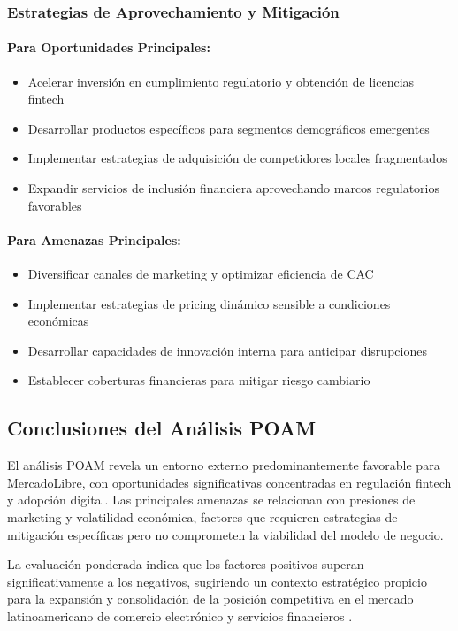 \subsubsection{Estrategias de Aprovechamiento y Mitigación}

\paragraph{Para Oportunidades Principales:}
\begin{itemize}
\item Acelerar inversión en cumplimiento regulatorio y obtención de licencias fintech
\item Desarrollar productos específicos para segmentos demográficos emergentes
\item Implementar estrategias de adquisición de competidores locales fragmentados
\item Expandir servicios de inclusión financiera aprovechando marcos regulatorios favorables
\end{itemize}

\paragraph{Para Amenazas Principales:}
\begin{itemize}
\item Diversificar canales de marketing y optimizar eficiencia de CAC
\item Implementar estrategias de pricing dinámico sensible a condiciones económicas
\item Desarrollar capacidades de innovación interna para anticipar disrupciones
\item Establecer coberturas financieras para mitigar riesgo cambiario
\end{itemize}

\subsection{Conclusiones del Análisis POAM}

El análisis POAM revela un entorno externo predominantemente favorable para MercadoLibre, con oportunidades significativas concentradas en regulación fintech y adopción digital. Las principales amenazas se relacionan con presiones de marketing y volatilidad económica, factores que requieren estrategias de mitigación específicas pero no comprometen la viabilidad del modelo de negocio.

La evaluación ponderada indica que los factores positivos superan significativamente a los negativos, sugiriendo un contexto estratégico propicio para la expansión y consolidación de la posición competitiva en el mercado latinoamericano de comercio electrónico y servicios financieros \autocite{porter1985}.

